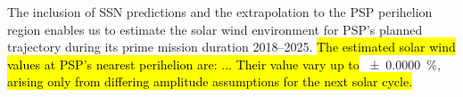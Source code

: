 {\textcolor{Green4}{ The inclusion of SSN predictions and the extrapolation to the PSP perihelion region enables us to estimate the solar wind environment for PSP's planned trajectory during its prime mission duration 2018--2025.} \hl{The estimated solar wind values at PSP's nearest perihelion are: ... Their value vary up to} \SI{+-0.0000}{\percent}, \hl{arising only from differing amplitude assumptions for the next solar cycle.}}	%
{}	%


\maketitle




